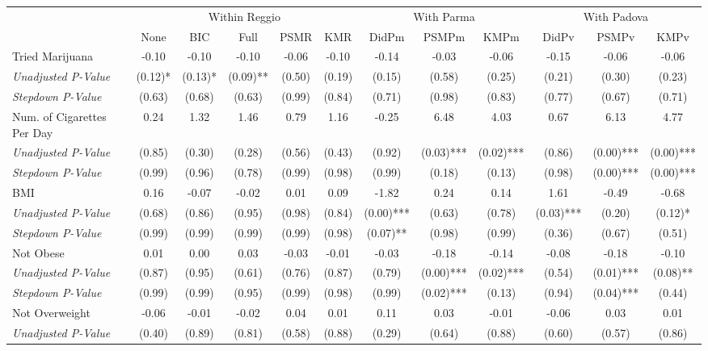 \begin{tabular}{l c c c c c c c c c c c}
\toprule
& \multicolumn{5}{c}{Within Reggio} & \multicolumn{3}{c}{With Parma} & \multicolumn{3}{c}{With Padova} \\\cmidrule(lr){2-6} \cmidrule(lr){7-9} \cmidrule(lr){10-12}
 & None & BIC & Full & PSMR & KMR & DidPm & PSMPm & KMPm & DidPv & PSMPv & KMPv \\
\midrule
Tried Marijuana & -0.10 & -0.10 & -0.10 & -0.06 & -0.10 & -0.14 & -0.03 & -0.06 & -0.15 & -0.06 & -0.06 \\
\quad \textit{Unadjusted P-Value} & (0.12)* & (0.13)* & (0.09)** & (0.50) & (0.19) & (0.15) & (0.58) & (0.25) & (0.21) & (0.30) & (0.23) \\
\quad \textit{Stepdown P-Value} & (0.63) & (0.68) & (0.63) & (0.99) & (0.84) & (0.71) & (0.98) & (0.83) & (0.77) & (0.67) & (0.71) \\
Num. of Cigarettes Per Day & 0.24 & 1.32 & 1.46 & 0.79 & 1.16 & -0.25 & 6.48 & 4.03 & 0.67 & 6.13 & 4.77 \\
\quad \textit{Unadjusted P-Value} & (0.85) & (0.30) & (0.28) & (0.56) & (0.43) & (0.92) & (0.03)*** & (0.02)*** & (0.86) & (0.00)*** & (0.00)*** \\
\quad \textit{Stepdown P-Value} & (0.99) & (0.96) & (0.78) & (0.99) & (0.98) & (0.99) & (0.18) & (0.13) & (0.98) & (0.00)*** & (0.00)*** \\
BMI & 0.16 & -0.07 & -0.02 & 0.01 & 0.09 & -1.82 & 0.24 & 0.14 & 1.61 & -0.49 & -0.68 \\
\quad \textit{Unadjusted P-Value} & (0.68) & (0.86) & (0.95) & (0.98) & (0.84) & (0.00)*** & (0.63) & (0.78) & (0.03)*** & (0.20) & (0.12)* \\
\quad \textit{Stepdown P-Value} & (0.99) & (0.99) & (0.99) & (0.99) & (0.98) & (0.07)** & (0.98) & (0.99) & (0.36) & (0.67) & (0.51) \\
Not Obese & 0.01 & 0.00 & 0.03 & -0.03 & -0.01 & -0.03 & -0.18 & -0.14 & -0.08 & -0.18 & -0.10 \\
\quad \textit{Unadjusted P-Value} & (0.87) & (0.95) & (0.61) & (0.76) & (0.87) & (0.79) & (0.00)*** & (0.02)*** & (0.54) & (0.01)*** & (0.08)** \\
\quad \textit{Stepdown P-Value} & (0.99) & (0.99) & (0.95) & (0.99) & (0.98) & (0.99) & (0.02)*** & (0.13) & (0.94) & (0.04)*** & (0.44) \\
Not Overweight & -0.06 & -0.01 & -0.02 & 0.04 & 0.01 & 0.11 & 0.03 & -0.01 & -0.06 & 0.03 & 0.01 \\
\quad \textit{Unadjusted P-Value} & (0.40) & (0.89) & (0.81) & (0.58) & (0.88) & (0.29) & (0.64) & (0.88) & (0.60) & (0.57) & (0.86) \\

\end{tabular}
